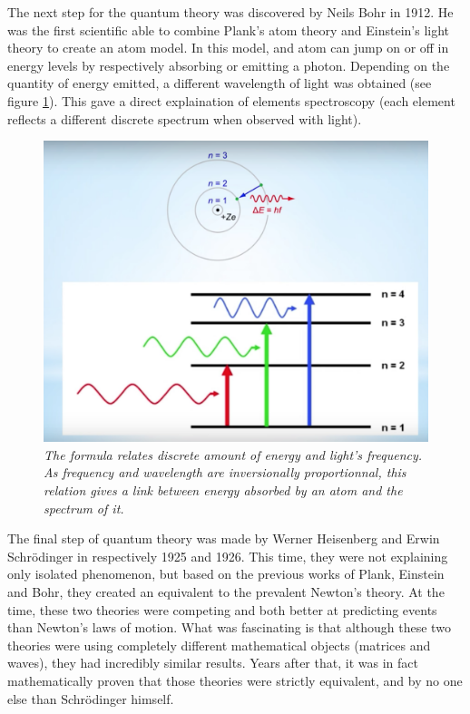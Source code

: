 \documentclass[a4paper,12pt]{report}
\newcommand{\para}[1]{\par{#1}\\}
\begin{document}
\para{
    The next step for the quantum theory was discovered by Neils Bohr in 1912. He was the first scientific able to combine Plank's atom theory and Einstein's light theory to create an atom model. In this model, and atom can jump on or off in energy levels by respectively absorbing or emitting a photon. Depending on the quantity of energy  emitted, a different wavelength of light was obtained (see figure \ref{bohr}). This gave a direct explaination of elements spectroscopy (each element reflects a different discrete spectrum when observed with light).
}

\begin{figure}
	\begin{center}
		\includegraphics[scale=0.4]{images/bohr}
	\end{center}
	\caption{\textit{The formula relates discrete amount of energy and light's frequency. As frequency and wavelength are inversionally proportionnal, this relation gives a link between energy absorbed by an atom and the spectrum of it. }}
	\label{bohr}
\end{figure}

\para{
    The final step of quantum theory was made by Werner Heisenberg and Erwin Schrödinger in respectively 1925 and 1926. This time, they were not explaining only isolated phenomenon, but based on the previous works of Plank, Einstein and Bohr, they created an equivalent to the prevalent Newton's theory. At the time, these two theories were competing and both better at predicting events than Newton's laws of motion. What was fascinating is that although these two theories were using completely different mathematical objects (matrices and waves), they had incredibly similar results. Years after that, it was in fact mathematically proven that those theories were strictly equivalent, and by no one else than Schrödinger himself.
}
\end{document}
